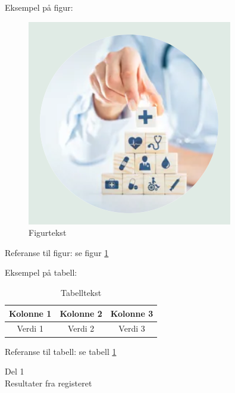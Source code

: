 \documentclass{article}
\begin{document}
    \vspace{5mm}
    
    Eksempel på figur: 
    
    \begin{figure}[h]
        \centering
        \includegraphics[width=0.5\linewidth]{Eksempelfigur.png}
        \caption{Figurtekst}
        \label{fig:eksempel}
    \end{figure}

    Referanse til figur: se figur \ref{fig:eksempel}

    \vspace{5mm}
    
    Eksempel på tabell: 

    \begin{table}[h]
        \centering
        \begin{tabular}{|c|c|c|}
            \hline
            Kolonne 1 & Kolonne 2 & Kolonne 3 \\ \hline
            Verdi 1 & Verdi 2 & Verdi 3 \\ \hline
        \end{tabular}
        \caption{Tabelltekst}
        \label{tab:eksempel}
    \end{table}

    Referanse til tabell: se tabell \ref{tab:eksempel}
    
    \newpage
    
    
    \begin{center}
        \huge
        Del 1 \\
        \vspace{5mm}
        Resultater fra registeret
        \normalsize
    \end{center}
    \newpage
    
\end{document}
